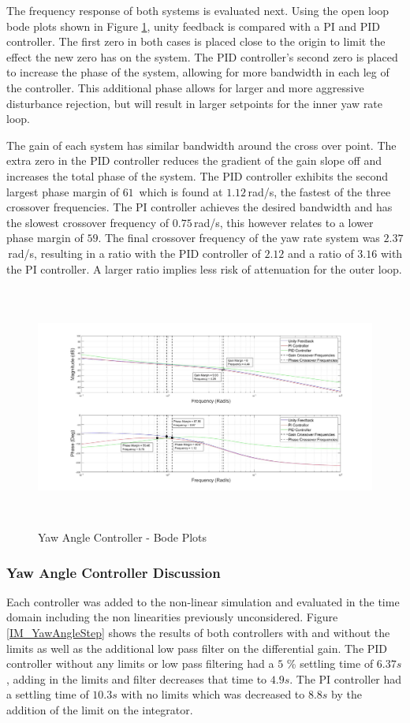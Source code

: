 \documentclass[12pt]{report}
\begin{document}
The frequency response of both systems is evaluated next. Using the open loop bode plots shown in Figure \ref{IM_YawAngleControlBode}, unity feedback is compared with a PI and PID controller. The first zero in both cases is placed close to the origin to limit the effect the new zero has on the system. The PID controller's second zero is placed to increase the phase of the system, allowing for more bandwidth in each leg of the controller. This additional phase allows for larger and more aggressive disturbance rejection, but will result in larger setpoints for the inner yaw rate loop.

The gain of each system has similar bandwidth around the cross over point. The extra zero in the PID controller reduces the gradient of the gain slope off and increases the total phase of the system. The PID controller exhibits the second largest phase margin of $61$\textdegree\ which is found at $1.12$\,rad/s, the fastest of the three crossover frequencies. The PI controller achieves the desired bandwidth and has the slowest crossover frequency of $0.75$\,rad/s, this however relates to a lower phase margin of $59$\textdegree. The final crossover frequency of the yaw rate system was $2.37$\,rad/s, resulting in a ratio with the PID controller of $2.12$ and a ratio of $3.16$ with the PI controller. A larger ratio implies less risk of attenuation for the outer loop.

\begin{figure}[H]
	\centering
	\includegraphics[height = 8cm]{../Design/Matlab/Controllers/yaw_angle_bode.jpg}
	\caption{Yaw Angle Controller -  Bode Plots}
	\label{IM_YawAngleControlBode}
\end{figure}

\subsubsection{Yaw Angle Controller Discussion}	
Each controller was added to the non-linear simulation and evaluated in the time domain including the non linearities previously unconsidered. Figure \ref{IM_YawAngleStep} shows the results of both controllers with and without the limits as well as the additional low pass filter on the differential gain. The PID controller without any limits or low pass filtering had a $5$ \% settling time of $6.37s$, adding in the limits and filter decreases that time to $4.9s$. The PI controller had a settling time of $10.3s$ with no limits which was decreased to $8.8s$ by the addition of the limit on the integrator.
\end{document}

